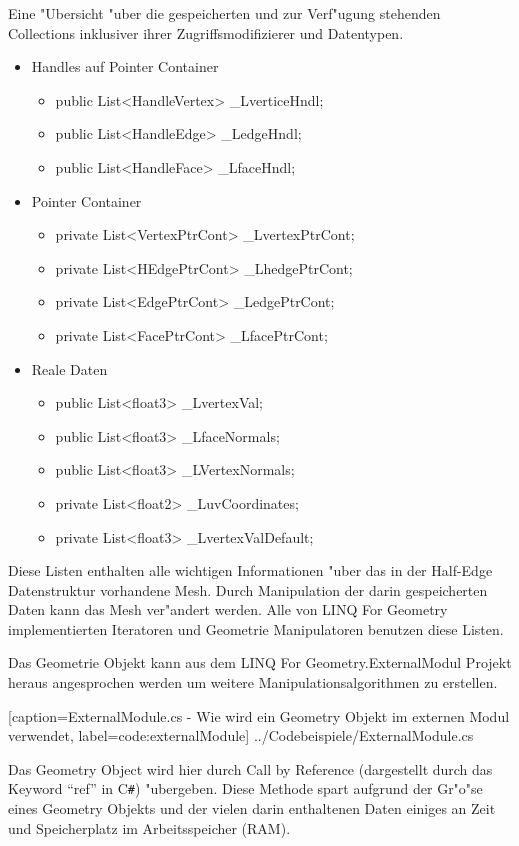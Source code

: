 \documentclass[pagesize, paper=a4, fontsize=12pt,titlepage=true, headings=small, headnosepline, abstractoff, liststotoc, nochapterprefix, plainheadsepline]{scrreprt}
\newcommand{\CS}{C\texttt{\#}}
\newcommand{\LFG}{LINQ For Geometry}
\newcommand{\LFGS}{LINQ For Geometry }
\newcommand{\HES}{Half-Edge Datenstruktur }
\begin{document}
Eine "Ubersicht "uber die gespeicherten und zur Verf"ugung stehenden Collections inklusiver ihrer Zugriffsmodifizierer und Datentypen.
\begin{itemize}
\item Handles auf Pointer Container
	\begin{itemize}
    \item public List<HandleVertex> \_LverticeHndl;
    \item public List<HandleEdge> \_LedgeHndl;
	\item public List<HandleFace> \_LfaceHndl;
	\end{itemize}
\item Pointer Container
	\begin{itemize}
	\item private List<VertexPtrCont> \_LvertexPtrCont;
	\item private List<HEdgePtrCont> \_LhedgePtrCont;
	\item private List<EdgePtrCont> \_LedgePtrCont;
	\item private List<FacePtrCont> \_LfacePtrCont;
	\end{itemize}
\item Reale Daten
	\begin{itemize}
	\item public List<float3> \_LvertexVal;
	\item public List<float3> \_LfaceNormals;
	\item public List<float3> \_LVertexNormals;
	\item private List<float2> \_LuvCoordinates;
	\item private List<float3> \_LvertexValDefault;
	\end{itemize}
\end{itemize}
Diese Listen enthalten alle wichtigen Informationen "uber das in der \HES vorhandene Mesh. Durch Manipulation der darin gespeicherten Daten kann das Mesh ver"andert werden. Alle von \LFGS implementierten Iteratoren und Geometrie Manipulatoren benutzen diese Listen.

Das Geometrie Objekt kann aus dem \LFG.ExternalModul Projekt heraus angesprochen werden um weitere Manipulationsalgorithmen zu erstellen.

			[caption={ExternalModule.cs - Wie wird ein Geometry Objekt im externen Modul verwendet}, label=code:externalModule]
			{../Codebeispiele/ExternalModule.cs}

Das Geometry Object wird hier durch Call by Reference (dargestellt durch das Keyword "`ref"' in \CS) "ubergeben. Diese Methode spart aufgrund der Gr"o"se eines Geometry Objekts und der vielen darin enthaltenen Daten einiges an Zeit und Speicherplatz im Arbeitsspeicher (RAM).
\end{document}

